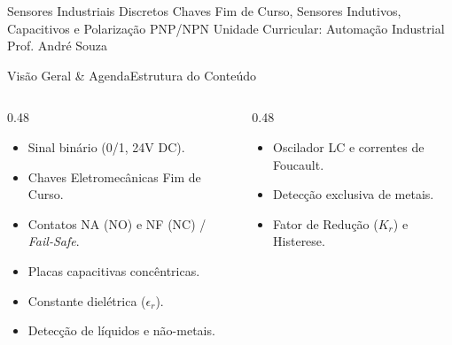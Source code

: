 
\senaicover
  {Sensores Industriais Discretos}
  {Chaves Fim de Curso, Sensores Indutivos, Capacitivos e Polarização PNP/NPN}
  {Unidade Curricular: Automação Industrial}
  {Prof. André Souza}

\begin{senaiframe}{Visão Geral \& Agenda}{Estrutura do Conteúdo}
  \begin{columns}[t]
    \begin{column}{0.48\textwidth}
      \begin{tcolorbox}[senaibluecard, title={1. Sensoriamento Discreto}]
        \begin{itemize}
          \item Sinal binário (0/1, 24V DC).
          \item Chaves Eletromecânicas Fim de Curso.
          \item Contatos NA (NO) e NF (NC) / \textit{Fail-Safe}.
        \end{itemize}
      \end{tcolorbox}
      \vspace{4pt}
      \begin{tcolorbox}[senaiambercard, title={3. Sensores Capacitivos}]
        \begin{itemize}
          \item Placas capacitivas concêntricas.
          \item Constante dielétrica ($\epsilon_r$).
          \item Detecção de líquidos e não-metais.
        \end{itemize}
      \end{tcolorbox}
    \end{column}
    \begin{column}{0.48\textwidth}
      \begin{tcolorbox}[senairedcard, title={2. Sensores Indutivos}]
        \begin{itemize}
          \item Oscilador LC e correntes de Foucault.
          \item Detecção exclusiva de metais.
          \item Fator de Redução ($K_r$) e Histerese.

\end{itemize}
\end{tcolorbox}
\end{column}
\end{columns}
\end{senaiframe}

